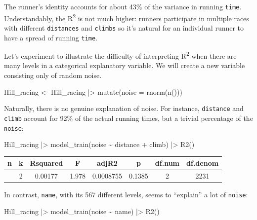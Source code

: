 \documentclass[
  letterpaper,
  DIV=11,
  numbers=noendperiod,
  oneside]{scrartcl}
\newenvironment{Shaded}{\begin{snugshade}}{\end{snugshade}}
\newcommand{\AttributeTok}[1]{\textcolor[rgb]{0.40,0.45,0.13}{#1}}
\newcommand{\FunctionTok}[1]{\textcolor[rgb]{0.28,0.35,0.67}{#1}}
\newcommand{\NormalTok}[1]{\textcolor[rgb]{0.00,0.23,0.31}{#1}}
\newcommand{\OtherTok}[1]{\textcolor[rgb]{0.00,0.23,0.31}{#1}}
\newcommand{\SpecialCharTok}[1]{\textcolor[rgb]{0.37,0.37,0.37}{#1}}
\begin{document}
The runner's identity accounts for about 43\% of the variance in running
\texttt{time}. Understandably, the R\textsuperscript{2} is not much
higher: runners participate in multiple races with different
\texttt{distances} and \texttt{climbs} so it's natural for an individual
runner to have a spread of running \texttt{time}.

Let's experiment to illustrate the difficulty of interpreting
R\textsuperscript{2} when there are many levels in a categorical
explanatory variable. We will create a new variable consisting only of
random noise.

\begin{Shaded}
\begin{Highlighting}[]
\NormalTok{Hill\_racing }\OtherTok{\textless{}{-}}\NormalTok{ Hill\_racing }\SpecialCharTok{|\textgreater{}} \FunctionTok{mutate}\NormalTok{(}\AttributeTok{noise =} \FunctionTok{rnorm}\NormalTok{(}\FunctionTok{n}\NormalTok{()))}
\end{Highlighting}
\end{Shaded}

Naturally, there is no genuine explanation of noise. For instance,
\texttt{distance} and \texttt{climb} account for 92\% of the actual
running times, but a trivial percentage of the \texttt{noise}:

\begin{Shaded}
\begin{Highlighting}[]
\NormalTok{Hill\_racing }\SpecialCharTok{|\textgreater{}} \FunctionTok{model\_train}\NormalTok{(noise }\SpecialCharTok{\textasciitilde{}}\NormalTok{ distance }\SpecialCharTok{+}\NormalTok{ climb) }\SpecialCharTok{|\textgreater{}} \FunctionTok{R2}\NormalTok{()}
\end{Highlighting}
\end{Shaded}

\begin{longtable}[]{@{}cccccccc@{}}
\toprule\noalign{}
n & k & Rsquared & F & adjR2 & p & df.num & df.denom \\
\midrule\noalign{}
\endhead
\bottomrule\noalign{}
\endlastfoot
2234 & 2 & 0.00177 & 1.978 & 0.0008755 & 0.1385 & 2 & 2231 \\
\end{longtable}

In contrast, \texttt{name}, with its 567 different levels, seems to
``explain'' a lot of \texttt{noise}:

\begin{Shaded}
\begin{Highlighting}[]
\NormalTok{Hill\_racing }\SpecialCharTok{|\textgreater{}} \FunctionTok{model\_train}\NormalTok{(noise }\SpecialCharTok{\textasciitilde{}}\NormalTok{ name) }\SpecialCharTok{|\textgreater{}} \FunctionTok{R2}\NormalTok{()}
\end{Highlighting}
\end{Shaded}
\end{document}

